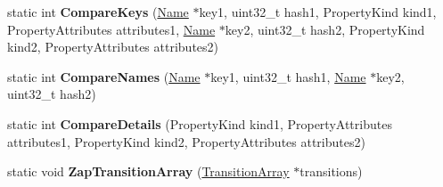 \begin{DoxyCompactItemize}
\item 
static int {\bfseries Compare\+Keys} (\hyperlink{classv8_1_1internal_1_1_name}{Name} $\ast$key1, uint32\+\_\+t hash1, Property\+Kind kind1, Property\+Attributes attributes1, \hyperlink{classv8_1_1internal_1_1_name}{Name} $\ast$key2, uint32\+\_\+t hash2, Property\+Kind kind2, Property\+Attributes attributes2)\hypertarget{classv8_1_1internal_1_1_transition_array_a2ca6d33f21d0621feb2f92ff2a9f2cfe}{}\label{classv8_1_1internal_1_1_transition_array_a2ca6d33f21d0621feb2f92ff2a9f2cfe}

\item 
static int {\bfseries Compare\+Names} (\hyperlink{classv8_1_1internal_1_1_name}{Name} $\ast$key1, uint32\+\_\+t hash1, \hyperlink{classv8_1_1internal_1_1_name}{Name} $\ast$key2, uint32\+\_\+t hash2)\hypertarget{classv8_1_1internal_1_1_transition_array_aa4b5d6af5f9763391b399cdcadc31694}{}\label{classv8_1_1internal_1_1_transition_array_aa4b5d6af5f9763391b399cdcadc31694}

\item 
static int {\bfseries Compare\+Details} (Property\+Kind kind1, Property\+Attributes attributes1, Property\+Kind kind2, Property\+Attributes attributes2)\hypertarget{classv8_1_1internal_1_1_transition_array_a3a1c57d2d50a62460a1003c38b7f081a}{}\label{classv8_1_1internal_1_1_transition_array_a3a1c57d2d50a62460a1003c38b7f081a}

\item 
static void {\bfseries Zap\+Transition\+Array} (\hyperlink{classv8_1_1internal_1_1_transition_array}{Transition\+Array} $\ast$transitions)\hypertarget{classv8_1_1internal_1_1_transition_array_a0bc7eeb3549484cbfb9304d35a8bb338}{}\label{classv8_1_1internal_1_1_transition_array_a0bc7eeb3549484cbfb9304d35a8bb338}

\end{DoxyCompactItemize}
